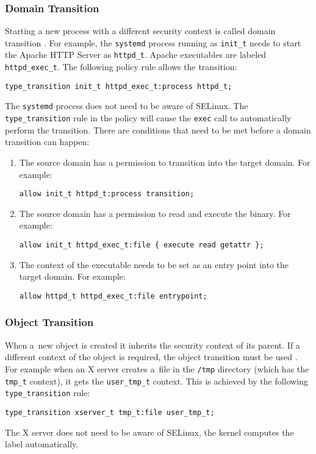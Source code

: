 \subsubsection{Domain Transition}
Starting a new process with a different security context is called domain
transition \cite[pp.~43--47]{tsn}. For example, the \texttt{systemd} process
running as \texttt{init\_t} needs to start the Apache HTTP Server as
\texttt{httpd\_t}. Apache executables are labeled \texttt{httpd\_exec\_t}. The
following policy rule allows the transition:
\begin{lstlisting}[language=te]
type_transition init_t httpd_exec_t:process httpd_t;
\end{lstlisting}
The \texttt{systemd} process does not need to be aware of SELinux. The
\texttt{type\_transition} rule in the policy will cause the \texttt{exec} call
to automatically perform the transition. There are conditions that need to be
met before a domain transition can happen:
\begin{enumerate}
    \item The source domain has a permission to transition into the target
        domain. For example:
\begin{lstlisting}[language=te]
allow init_t httpd_t:process transition;
\end{lstlisting}
    \item The source domain has a permission to read and execute the binary. For
        example:
\begin{lstlisting}[language=te]
allow init_t httpd_exec_t:file { execute read getattr };
\end{lstlisting}
    \item The context of the executable needs to be set as an entry point into
        the target domain. For example:
\begin{lstlisting}[language=te]
allow httpd_t httpd_exec_t:file entrypoint;
\end{lstlisting}
\end{enumerate}

\subsubsection{Object Transition}
When a~new object is created it inherits the security context of its parent. If
a different context of the object is required, the object transition must be
used \cite[pp.~47--48]{tsn}. For example when an X server creates a~file in the
\texttt{/tmp} directory (which has the \texttt{tmp\_t} context), it gets the 
\texttt{user\_tmp\_t} context. This is achieved by the following
\texttt{type\_transition} rule:
\begin{lstlisting}[language=te]
type_transition xserver_t tmp_t:file user_tmp_t;
\end{lstlisting}
The X server does not need to be aware of SELinux, the kernel computes the label
automatically.

